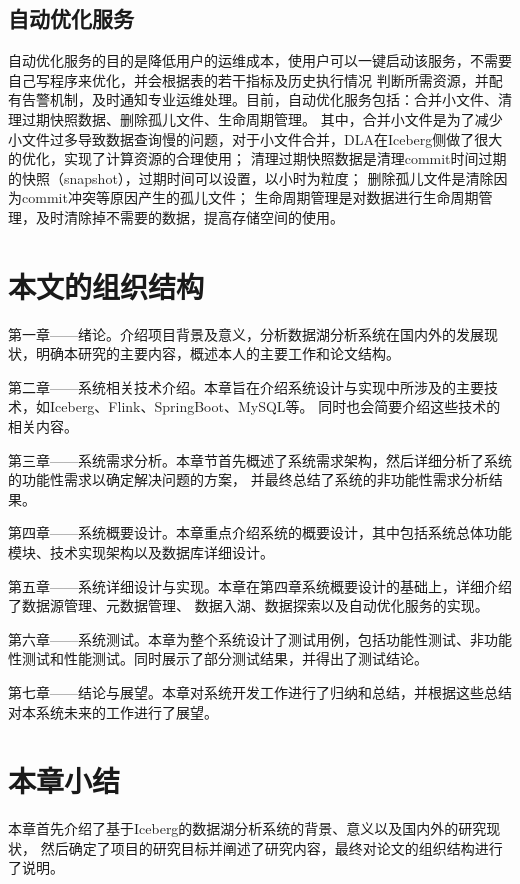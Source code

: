 \subsection{自动优化服务}

自动优化服务的目的是降低用户的运维成本，使用户可以一键启动该服务，不需要自己写程序来优化，并会根据表的若干指标及历史执行情况
判断所需资源，并配有告警机制，及时通知专业运维处理。目前，自动优化服务包括：合并小文件、清理过期快照数据、删除孤儿文件、生命周期管理。
其中，合并小文件是为了减少小文件过多导致数据查询慢的问题，对于小文件合并，DLA在Iceberg侧做了很大的优化，实现了计算资源的合理使用；
清理过期快照数据是清理commit时间过期的快照（snapshot），过期时间可以设置，以小时为粒度；
删除孤儿文件是清除因为commit冲突等原因产生的孤儿文件；
生命周期管理是对数据进行生命周期管理，及时清除掉不需要的数据，提高存储空间的使用。

\section{本文的组织结构}

第一章——绪论。介绍项目背景及意义，分析数据湖分析系统在国内外的发展现状，明确本研究的主要内容，概述本人的主要工作和论文结构。

第二章——系统相关技术介绍。本章旨在介绍系统设计与实现中所涉及的主要技术，如Iceberg、Flink、SpringBoot、MySQL等。
同时也会简要介绍这些技术的相关内容。

第三章——系统需求分析。本章节首先概述了系统需求架构，然后详细分析了系统的功能性需求以确定解决问题的方案，
并最终总结了系统的非功能性需求分析结果。

第四章——系统概要设计。本章重点介绍系统的概要设计，其中包括系统总体功能模块、技术实现架构以及数据库详细设计。

第五章——系统详细设计与实现。本章在第四章系统概要设计的基础上，详细介绍了数据源管理、元数据管理、
数据入湖、数据探索以及自动优化服务的实现。

第六章——系统测试。本章为整个系统设计了测试用例，包括功能性测试、非功能性测试和性能测试。同时展示了部分测试结果，并得出了测试结论。

第七章——结论与展望。本章对系统开发工作进行了归纳和总结，并根据这些总结对本系统未来的工作进行了展望。

\section{本章小结}

本章首先介绍了基于Iceberg的数据湖分析系统的背景、意义以及国内外的研究现状，
然后确定了项目的研究目标并阐述了研究内容，最终对论文的组织结构进行了说明。
